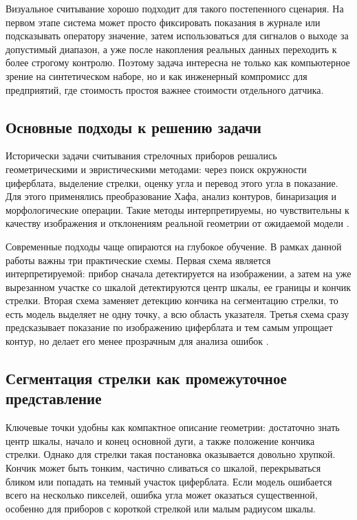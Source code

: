 \documentclass[a4paper,14pt]{extarticle}
\begin{document}
Визуальное считывание хорошо подходит для такого постепенного сценария. На первом этапе система может просто фиксировать показания в журнале или подсказывать оператору значение, затем использоваться для сигналов о выходе за допустимый диапазон, а уже после накопления реальных данных переходить к более строгому контролю. Поэтому задача интересна не только как компьютерное зрение на синтетическом наборе, но и как инженерный компромисс для предприятий, где стоимость простоя важнее стоимости отдельного датчика.

	\subsection{Основные подходы к решению задачи}

Исторически задачи считывания стрелочных приборов решались геометрическими и эвристическими методами: через поиск окружности циферблата, выделение стрелки, оценку угла и перевод этого угла в показание. Для этого применялись преобразование Хафа, анализ контуров, бинаризация и морфологические операции. Такие методы интерпретируемы, но чувствительны к качеству изображения и отклонениям реальной геометрии от ожидаемой модели \cite{hassanein2015,incrementalHough2016,dyer1983,coords2023,kudrina2014}.

Современные подходы чаще опираются на глубокое обучение. В рамках данной работы важны три практические схемы. Первая схема является интерпретируемой: прибор сначала детектируется на изображении, а затем на уже вырезанном участке со шкалой детектируются центр шкалы, ее границы и кончик стрелки. Вторая схема заменяет детекцию кончика на сегментацию стрелки, то есть модель выделяет не одну точку, а всю область указателя. Третья схема сразу предсказывает показание по изображению циферблата и тем самым упрощает контур, но делает его менее прозрачным для анализа ошибок \cite{yoloSurvey2022,howells2021,reitsma2024,leon2024,meterRegression2024,sciRep2025,deng2022,peng2024,linknetYolo2024}.

	\subsection{Сегментация стрелки как промежуточное представление}

	Ключевые точки удобны как компактное описание геометрии: достаточно знать центр шкалы, начало и конец основной дуги, а также положение кончика стрелки. Однако для стрелки такая постановка оказывается довольно хрупкой. Кончик может быть тонким, частично сливаться со шкалой, перекрываться бликом или попадать на темный участок циферблата. Если модель ошибается всего на несколько пикселей, ошибка угла может оказаться существенной, особенно для приборов с короткой стрелкой или малым радиусом шкалы.
\end{document}
